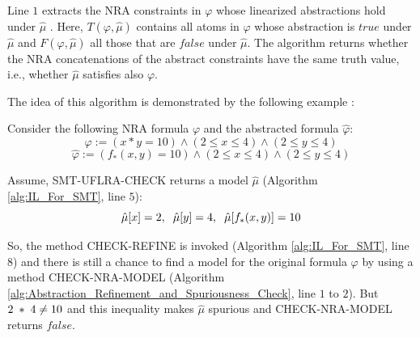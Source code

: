 \noindent Line $1$ extracts the NRA constraints in $\varphi$ whose linearized abstractions hold under $\hat{\mu}$ \cite{Cimatti:2018:ILS:3274693.3230639}.
Here, $T(\varphi, \hat{\mu})$ contains all atoms in $\varphi$ whose abstraction is $true$ under $\hat{\mu}$ and $F(\varphi, \hat{\mu})$ all those that are $false$ under $\hat{\mu}$.
The algorithm returns whether the NRA concatenations of the abstract constraints have the same truth value, i.e., whether $\hat{\mu}$
 satisfies also $\varphi$.\newline

\noindent The idea of this algorithm is demonstrated by the following example \cite{Cimatti:2018:ILS:3274693.3230639}:\newline

\begin{example}
Consider the following NRA formula $\varphi$ and the abstracted formula $\hat{\varphi}$:
$$\varphi := (x \ast y = 10) \wedge (2 \leq x \leq 4) \wedge (2 \leq y \leq 4)$$
$$\hat{\varphi} := (f_{\ast}(x, y) = 10) \wedge (2 \leq x \leq 4) \wedge (2 \leq y \leq 4)$$

\noindent Assume, SMT-UFLRA-CHECK returns a model $\hat{\mu}$ (Algorithm \ref{alg:IL_For_SMT}, line $5$):
$$\hat{\mu}[x] = 2, \hspace{2mm}\hat{\mu}[y] = 4, \hspace{2mm}\hat{\mu}[f_\ast(x, y)] = 10$$
\end{example}

\noindent So, the method CHECK-REFINE is invoked (Algorithm \ref{alg:IL_For_SMT}, line $8$) and there is still a chance to find a model for the original formula $\varphi$ by using a method CHECK-NRA-MODEL (Algorithm \ref{alg:Abstraction_Refinement_and_Spuriousness_Check}, line $1$ to $2$).
But $2 \hspace{1mm} \ast \hspace{1mm} 4 \neq 10$ and this inequality makes $\hat{\mu}$ spurious and CHECK-NRA-MODEL returns $false$.
